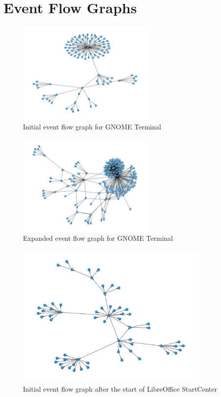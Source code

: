 \chapter{Event Flow Graphs}\label{event_flow_graphs}

\begin{figure}[H]
	\centering
	\includegraphics[width=0.6\textwidth,clip]{obrazky-figures/gnome-terminal_n_start.png}
	\caption{Initial event flow graph for GNOME Terminal}
	\label{gnome-terminal-graph1}
\end{figure}

\begin{figure}[H]
	\centering
	\includegraphics[width=0.6\textwidth,clip]{obrazky-figures/gnome-terminal_n_final.png}
	\caption{Expanded event flow graph for GNOME Terminal}
	\label{gnome-terminal-graph2}
\end{figure}

\begin{figure}[H]
	\centering
	\includegraphics[width=0.85\textwidth,clip]{obrazky-figures/libreoffice_n_start.png}
	\caption{Initial event flow graph after the start of LibreOffice StartCenter}
	\label{libreoffice-graph1}
\end{figure}

